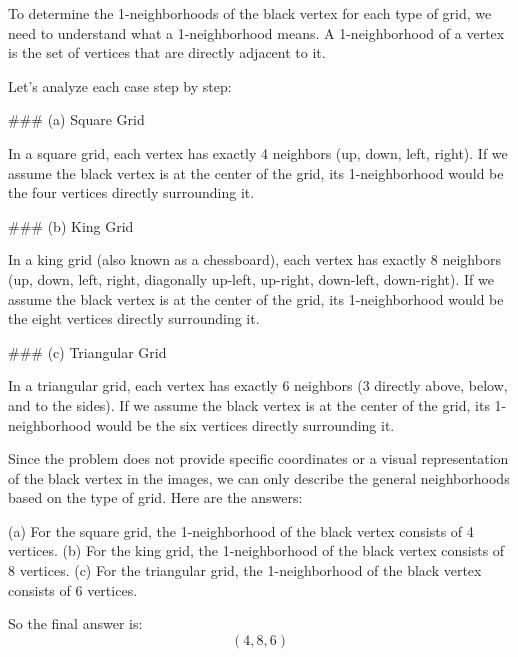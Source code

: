 To determine the 1-neighborhoods of the black vertex for each type of grid, we need to understand what a 1-neighborhood means. A 1-neighborhood of a vertex is the set of vertices that are directly adjacent to it.

Let's analyze each case step by step:

### (a) Square Grid

In a square grid, each vertex has exactly 4 neighbors (up, down, left, right). If we assume the black vertex is at the center of the grid, its 1-neighborhood would be the four vertices directly surrounding it.

### (b) King Grid

In a king grid (also known as a chessboard), each vertex has exactly 8 neighbors (up, down, left, right, diagonally up-left, up-right, down-left, down-right). If we assume the black vertex is at the center of the grid, its 1-neighborhood would be the eight vertices directly surrounding it.

### (c) Triangular Grid

In a triangular grid, each vertex has exactly 6 neighbors (3 directly above, below, and to the sides). If we assume the black vertex is at the center of the grid, its 1-neighborhood would be the six vertices directly surrounding it.

Since the problem does not provide specific coordinates or a visual representation of the black vertex in the images, we can only describe the general neighborhoods based on the type of grid. Here are the answers:

(a) For the square grid, the 1-neighborhood of the black vertex consists of 4 vertices.
(b) For the king grid, the 1-neighborhood of the black vertex consists of 8 vertices.
(c) For the triangular grid, the 1-neighborhood of the black vertex consists of 6 vertices.

So the final answer is:
\[
\boxed{(4, 8, 6)}
\]